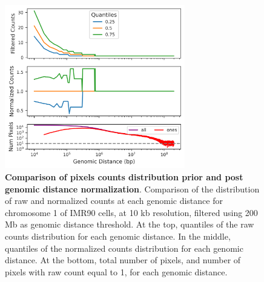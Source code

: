 \begin{figure}[ht]
  \centering
  \includegraphics[width=0.7\textwidth]{normalization_stats.png}
  \caption{\textbf{Comparison of pixels counts distribution prior and post genomic distance normalization}. Comparison of the distribution of raw and normalized counts at each genomic distance for chromosome 1 of IMR90 cells, at 10 kb resolution, filtered using 200 Mb as genomic distance threshold. At the top, quantiles of the raw counts distribution for each genomic distance. In the middle, quantiles of the normalized counts distribution for each genomic distance. At the bottom, total number of pixels, and number of pixels with raw count equal to 1, for each genomic distance.}
  \label{fig:normstats}
\end{figure}

